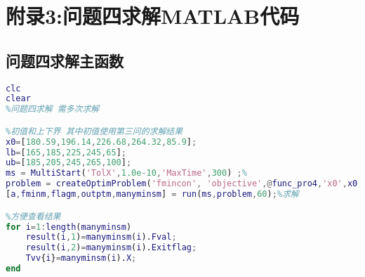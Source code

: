 \documentclass[12pt]{ctexart}
\numberwithin{figure}{section}
\numberwithin{table}{section}
\begin{document}
\section{附录3:问题四求解MATLAB代码}
\subsection{问题四求解主函数}
\begin{lstlisting}[language=MATLAB]
clc
clear
%问题四求解 需多次求解

%初值和上下界 其中初值使用第三问的求解结果
x0=[180.59,196.14,226.68,264.32,85.9];
lb=[165,185,225,245,65];
ub=[185,205,245,265,100];
ms = MultiStart('TolX',1.0e-10,'MaxTime',300) ;%
problem = createOptimProblem('fmincon', 'objective',@func_pro4,'x0',x0, 'lb',lb,'ub',ub);
[a,fminm,flagm,outptm,manyminsm] = run(ms,problem,60);%求解

%方便查看结果
for i=1:length(manyminsm)
    result(i,1)=manyminsm(i).Fval;
    result(i,2)=manyminsm(i).Exitflag;
    Tvv{i}=manyminsm(i).X;
end
\end{lstlisting}
\end{document}
